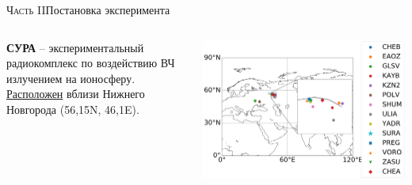 \begin{frame}{\textsc{Часть II}}{Постановка эксперимента}
\begin{columns}
\begin{column}{0.3\textwidth}
\textbf{СУРА} -- экспериментальный радиокомплекс по воздействию ВЧ излучением на ионосферу. \href{https://clck.ru/NfWnc}{Расположен} вблизи Нижнего Новгорода (56,15\degree N, 46,1\degree E). 
\end{column}
\begin{column}{0.7\textwidth}
\includegraphics[width=\textwidth]{../fig/sites.png}  
\end{column}
\end{columns}
\end{frame}


